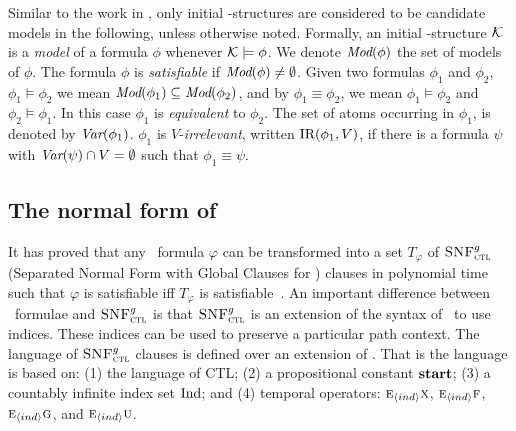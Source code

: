 \documentclass{article}
\begin{document}
Similar to the work in \cite{DBLP:journals/tcs/BrowneCG88,Bolotov:1999:JETAI},
only initial \MPK-structures are considered to be candidate models
in the following, unless otherwise noted. Formally,
an initial \MPK-structure $\cal K$ is a {\em model} of a formula $\phi$
whenever ${\cal K}\models\phi$.
We denote $\textit{Mod}(\phi)$ the set of models of $\phi$.
The formula $\phi$  is {\em satisfiable}
if $\textit{Mod}(\phi)\neq\emptyset$.
Given two formulas $\phi_1$ and $\phi_2$,  $\phi_1\models\phi_2$ we mean $\textit{Mod}(\phi_1)\subseteq\textit{Mod}(\phi_2)$, and
by $\phi_1\equiv\phi_2$, we mean $\phi_1\models\phi_2$ and $\phi_2\models\phi_1$.
In this case $\phi_1$ is {\em equivalent} to $\phi_2$.
The set of atoms occurring in $\phi_1$, is denoted by $\textit{Var}(\phi_1)$.
 $\phi_1$ is $V$-{\em irrelevant}, written $\textrm{IR}(\phi_1,V)$,
if there is a formula $\psi$ with
$\textit{Var}(\psi)\cap V=\emptyset$ such that $\phi_1\equiv\psi$.


\subsection{The normal form of \CTL}
It has proved that any \CTL\ formula $\varphi$ can be transformed into a set $T_\varphi$ of ${\textsc{SNF}_{\textsc{ctl}}^g}$ (Separated Normal Form with Global Clauses for \CTL) clauses in polynomial time such that $\varphi$ is satisfiable iff $T_\varphi$ is satisfiable~\cite{zhang2008first}.
An important difference between \CTL\ formulae and ${\textsc{SNF}_{\textsc{ctl}}^g}$ is that ${\textsc{SNF}_{\textsc{ctl}}^g}$ is an extension of the syntax of \CTL\ to use indices. These indices can be used to preserve a particular path context. The language of ${\textsc{SNF}_{\textsc{ctl}}^g}$ clauses is defined over an extension of \CTL. That is the language is based on: (1) the language of CTL; (2) a propositional constant $\textbf{start}$; (3) a countably infinite index set $\textrm{Ind}$; and (4) temporal operators: $\textsc{e}_{{\langle{ind}\rangle}} \textsc{x}$, $\textsc{e}_{{\langle{ind}\rangle}} \textsc{f}$, $\textsc{e}_{{\langle{ind}\rangle}} \textsc{g}$, and $\textsc{e}_{{\langle{ind}\rangle}} \textsc{u}$. %

\end{document}
